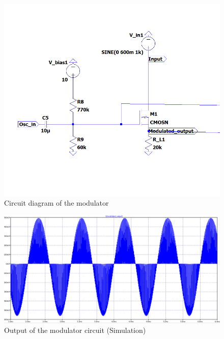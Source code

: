 \documentclass[conference]{IEEEtran}
\begin{document}
\begin{figure}
    \centering
    \includegraphics[width=1\linewidth]{Images/Modulator_ltspice.png}
    \caption{Circuit diagram of the modulator}
\end{figure}
\begin{figure}
    \centering
    \includegraphics[width=1\linewidth]{Images/modulated_output_ltspice.png}
    \caption{Output of the modulator circuit (Simulation)}
\end{figure}
\end{document}
